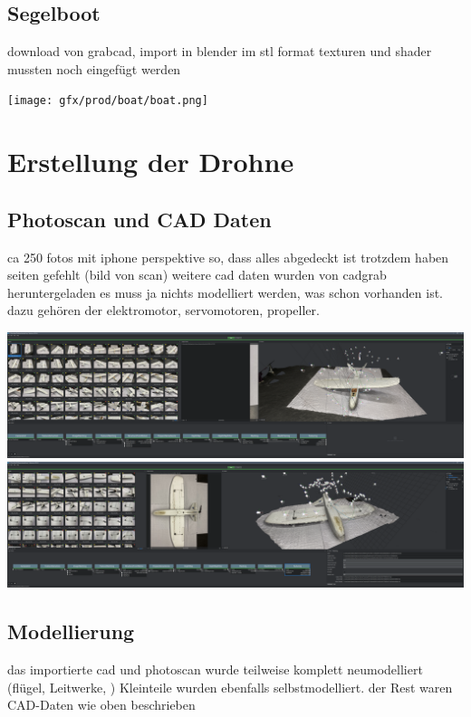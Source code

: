 \subsection{Segelboot}

download von grabcad, import in blender im stl format
texturen und shader mussten noch eingefügt werden

\texttt{[image: gfx/prod/boat/boat.png]}


\section{Erstellung der Drohne}

\subsection{Photoscan und CAD Daten}

ca 250 fotos mit iphone
perspektive so, dass alles abgedeckt ist
trotzdem haben seiten gefehlt
(bild von scan)
weitere cad daten wurden von cadgrab heruntergeladen
es muss ja nichts modelliert werden, was schon vorhanden ist.
dazu gehören der elektromotor, servomotoren, propeller.

\includegraphics{gfx/prod/plane/meshroom1.png}
\includegraphics{gfx/prod/plane/meshroom2.png}


\subsection{Modellierung}

das importierte cad und photoscan wurde teilweise komplett neumodelliert (flügel, Leitwerke, )
Kleinteile wurden ebenfalls selbstmodelliert.
der Rest waren CAD-Daten wie oben beschrieben

